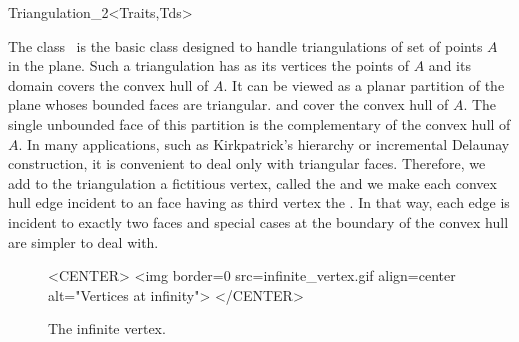 

\begin{ccRefClass}{Triangulation_2<Traits,Tds>}  %


\ccDefinition
  
The class \ccRefName\ is the basic class 
designed to handle triangulations
of set of points ${  A}$ in the plane.
Such a triangulation has as its vertices the points of ${  A}$
and its domain covers the convex hull of ${  A}$.
It can be viewed as a planar partition of the plane
whoses bounded faces are triangular. and cover
the convex hull of ${  A}$. The single unbounded face of this partition
is the complementary of the convex hull of ${  A}$. 
In many applications, such as Kirkpatrick's hierarchy
or incremental Delaunay construction, it is convenient to
deal only with triangular faces. Therefore, we add to the
triangulation
a fictitious vertex, called the 
and we make each  convex hull edge incident 
to an  
face having as third vertex  the .
 In that way, each edge is incident to exactly two faces
and special cases at the
boundary of the convex hull are simpler to deal with.



\begin{figure}
\begin{ccTexOnly}
\begin{center}   \end{center}
\end{ccTexOnly}
\caption{The infinite vertex.
\label{Triangulation_ref_Fig_infinite_vertex}}
\begin{ccHtmlOnly}
<CENTER>
<img border=0 src=infinite_vertex.gif align=center alt="Vertices at
infinity">
</CENTER>
\end{ccHtmlOnly}
\end{figure}


\end{ccRefClass}
